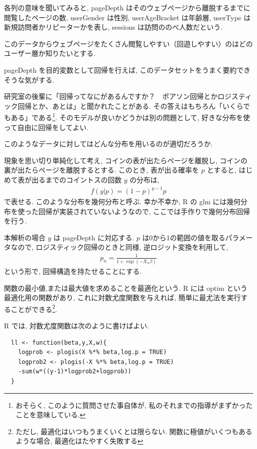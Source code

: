 \documentclass[a4paper, 12pt]{jarticle}
\begin{document}
各列の意味を聞いてみると, pageDepth はそのウェブページから離脱するまでに閲覧したページの数, userGender は性別, userAgeBracket は年齢層, userType は新規訪問者かリピーターかを表し, sessions は訪問ののべ人数だという.

このデータからウェブページをたくさん閲覧しやすい（回遊しやすい）のはどのユーザー層か知りたいとする. 

pageDepth を目的変数として回帰を行えば, このデータセットをうまく要約できそうな気がする. 

研究室の後輩に「回帰ってなにがあるんですか？　ポアソン回帰とかロジスティック回帰とか、あとは」と聞かれたことがある. 
その答えはもちろん「いくらでもある」である\footnote{おそらく, このように質問させた事自体が, 私のそれまでの指導がまずかったことを意味している.}. そのモデルが良いかどうかは別の問題として, 好きな分布を使って自由に回帰をしてよい. 

このようなデータに対してはどんな分布を用いるのが適切だろうか.

現象を思い切り単純化して考え, コインの表が出たらページを離脱し, コインの裏が出たらページを離脱するとする. このとき, 表が出る確率を $p$ とすると, はじめて表が出るまでのコイントスの回数 $y$ の分布は, 
\begin{align}
f(y|p) = (1-p)^{y-1} p
\end{align}
で表せる. 
このような分布を幾何分布と呼ぶ. 
幸か不幸か, R の glm には幾何分布を使った回帰が実装されていないようなので, ここでは手作りで幾何分布回帰を行う. 

本解析の場合 $y$ は pageDepth に対応する. 
$p$ は0から1の範囲の値を取るパラメータなので, ロジスティック回帰のときと同様, 逆ロジット変換を利用して, 
\begin{align}
p_n = \frac{1}{1+\exp(-X_n \beta)}
\end{align}
という形で, 回帰構造を持たせることにする.

関数の最小値,または最大値を求めることを最適化という. 
R には optim という最適化用の関数があり, これに対数尤度関数を与えれば, 簡単に最尤法を実行することができる\footnote{ただし, 最適化はいつもうまくいくとは限らない. 関数に極値がいくつもあるような場合, 最適化はたやすく失敗する}. 

R では, 対数尤度関数は次のように書けばよい. 

\begin{verbatim}
  ll <- function(beta,y,X,w){
    logprob <- plogis(X %*% beta,log.p = TRUE)
    logprob2 <- plogis(-X %*% beta,log.p = TRUE)
    -sum(w*((y-1)*logprob2+logprob))
  }
\end{verbatim}
\end{document}
